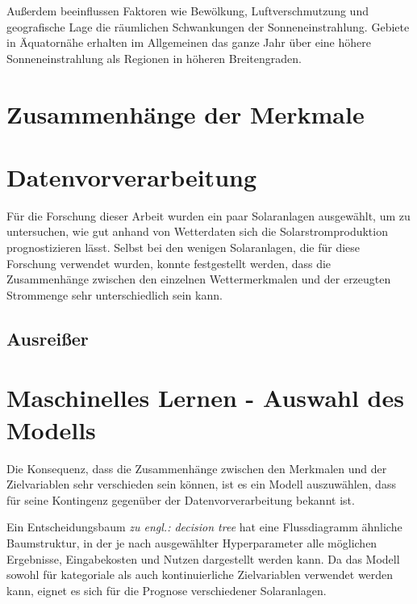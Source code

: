 \documentclass[12pt, a4paper]{article}
\begin{document}
Außerdem beeinflussen Faktoren wie Bewölkung, Luftverschmutzung und geografische Lage die räumlichen Schwankungen der Sonneneinstrahlung. Gebiete in Äquatornähe erhalten im Allgemeinen das ganze Jahr über eine höhere Sonneneinstrahlung als Regionen in höheren Breitengraden.









\newpage

\section{Zusammenhänge der Merkmale}

\newpage

\section{Datenvorverarbeitung}

Für die Forschung dieser Arbeit wurden ein paar Solaranlagen ausgewählt, um zu untersuchen, wie gut anhand von Wetterdaten sich die Solarstromproduktion prognostizieren lässt. Selbst bei den wenigen Solaranlagen, die für diese Forschung verwendet wurden, konnte festgestellt werden, dass die Zusammenhänge zwischen den einzelnen Wettermerkmalen und der erzeugten Strommenge sehr unterschiedlich sein kann.

\subsection{Ausreißer}


\newpage

\section{Maschinelles Lernen - Auswahl des Modells}

Die Konsequenz, dass die Zusammenhänge zwischen den Merkmalen und der Zielvariablen sehr verschieden sein können, ist es ein Modell auszuwählen, dass für seine Kontingenz gegenüber der Datenvorverarbeitung bekannt ist. 

Ein Entscheidungsbaum \textit{zu engl.: decision tree} hat eine Flussdiagramm ähnliche Baumstruktur, in der je nach ausgewählter Hyperparameter alle möglichen Ergebnisse, Eingabekosten und Nutzen dargestellt werden kann. Da das Modell sowohl für kategoriale als auch kontinuierliche Zielvariablen verwendet werden kann, eignet es sich für die Prognose verschiedener Solaranlagen. 
\end{document}

